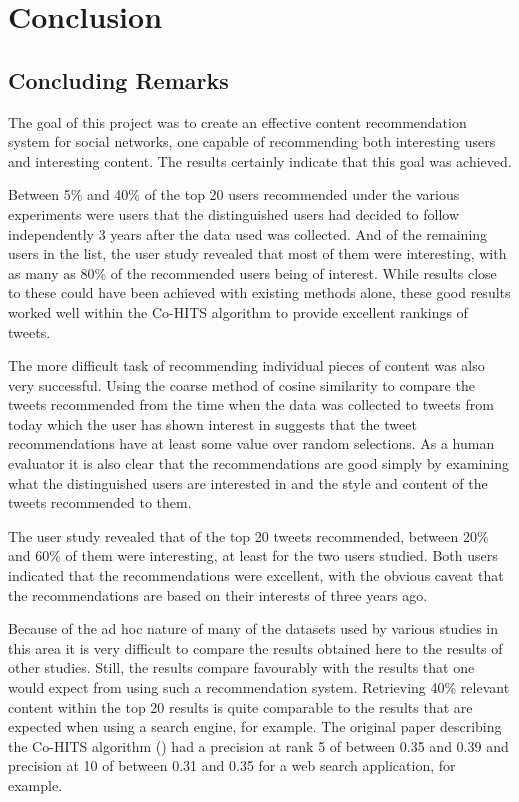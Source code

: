 \chapter{Conclusion}

\section{Concluding Remarks}

The goal of this project was to create an effective content recommendation system for social networks, one capable of recommending both interesting users and interesting content. The results certainly indicate that this goal was achieved.

Between 5\% and 40\% of the top 20 users recommended under the various experiments were users that the distinguished users had decided to follow independently 3 years after the data used was collected. And of the remaining users in the list, the user study revealed that most of them were interesting, with as many as 80\% of the recommended users being of interest. While results close to these could have been achieved with existing methods alone, these good results worked well within the Co-HITS algorithm to provide excellent rankings of tweets.

The more difficult task of recommending individual pieces of content was also very successful. Using the coarse method of cosine similarity to compare the tweets recommended from the time when the data was collected to tweets from today which the user has shown interest in suggests that the tweet recommendations have at least some value over random selections. As a human evaluator it is also clear that the recommendations are good simply by examining what the distinguished users are interested in and the style and content of the tweets recommended to them.

The user study revealed that of the top 20 tweets recommended, between 20\% and 60\% of them were interesting, at least for the two users studied. Both users indicated that the recommendations were excellent, with the obvious caveat that the recommendations are based on their interests of three years ago.

Because of the ad hoc nature of many of the datasets used by various studies in this area it is very difficult to compare the results obtained here to the results of other studies. Still, the results compare favourably with the results that one would expect from using such a recommendation system. Retrieving 40\% relevant content within the top 20 results is quite comparable to the results that are expected when using a search engine, for example. The original paper describing the Co-HITS algorithm (\cite{Deng2009}) had a precision at rank 5 of between 0.35 and 0.39 and precision at 10 of between 0.31 and 0.35 for a web search application, for example.

